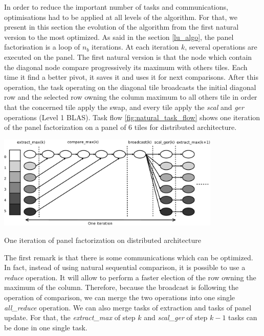 In order to reduce the important number of tasks and communications, optimisations had to be applied at all levels of the algorithm. For that, we present in this section the evolution of the algorithm from the first natural version to the most optimized. As said in the section \ref{lu_algo}, the panel factorisation is a loop of $n_b$ iterations. At each iteration $k$, several operations are executed on the panel.
The first natural version is that the node which contain the diagonal node compare progressively its maximum with others tiles. Each time it find a better pivot, it saves it and uses it for next comparisons. After this operation, the task operating on the diagonal tile broadcasts the initial diagonal row and the selected row owning the column maximum to all others tile in order that the concerned tile apply the swap, and every tile apply the \emph{scal} and \emph{ger} operations (Level 1 BLAS). Task flow \ref{fig:natural_task_flow} shows one iteration of the panel factorization on a panel of 6 tiles for distributed architecture.

\begin{taskflow}[!ht]
\centering
\includegraphics[width=0.8\textwidth]{figures/natural_tf_bw.pdf}
\caption{One iteration of panel factorization on distributed architecture \label{fig:natural_task_flow}}
\end{taskflow}

The first remark is that there is some communications which can be optimized. In fact, instead of using natural sequential comparison, it is possible to use a \emph{reduce} operation. It will allow to perform a faster election of the row owning the maximum of the column. Therefore, because the broadcast is following the operation of comparison, we can merge the two operations into one single \emph{all\_reduce} operation.
We can also merge tasks of extraction and tasks of panel update. For that, the \emph{extract\_max} of step $k$ and \emph{scal\_ger} of step $k-1$ tasks can be done in one single task.

